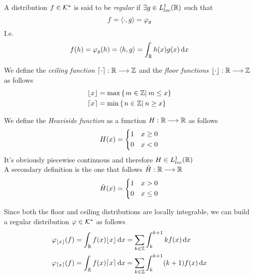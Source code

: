\documentclass[../complete.tex]{subfiles}
\begin{document}
\begin{dfn}
	A distribution $f\in\mathcal{K}^\star$ is said to be \textit{regular} if $\exists g\in L^1_{loc}(\mathbb{R})$ such that
	\begin{equation*}
		f=\langle \cdot, g \rangle=\varphi_g
	\end{equation*}
	I.e.
	\begin{equation*}
		f(h)=\varphi_g(h)=\langle h, g \rangle=\int_{\mathbb{R}}^{}h(x)g(x)\operatorname{d\!} x
	\end{equation*}
\end{dfn}
\begin{dfn}
	We define the \textit{ceiling function} $\lceil\cdot\rceil:\mathbb{R}\overset{}{\longrightarrow}\mathbb{Z}$ and the \textit{floor functions} $\lfloor\cdot\rfloor:\mathbb{R}\overset{}{\longrightarrow}\mathbb{Z}$ as follows
	\begin{equation}
		\begin{aligned}
			\lfloor x\rfloor&=\max\left\{ \left.m\in\mathbb{Z}\right|_{}m\le x \right\}\\
			\lceil x\rceil&=\min\left\{ \left.n\in\mathbb{Z}\right|_{}n\ge x \right\}
		\end{aligned}
		\label{eq:floorceil}
	\end{equation}
\end{dfn}
\begin{dfn}
	We define the \textit{Heaviside function} as a function $H:\mathbb{R}\overset{}{\longrightarrow}\mathbb{R}$ as follows
	\begin{equation*}
		H(x)=\begin{dcases}1&x\ge0\\0&x<0\end{dcases}
	\end{equation*}
	It's obviously piecewise continuous and therefore $H\in L^1_{loc}(\mathbb{R})$\\
	A secondary definition is the one that follows $\tilde{H}:\mathbb{R}\overset{}{\longrightarrow}\mathbb{R}$
	\begin{equation*}
		\tilde{H}(x)=\begin{dcases}1&x>0\\0&x\le0\end{dcases}
	\end{equation*}
\end{dfn}
\begin{eg}
	Since both the floor and ceiling distributions are locally integrable, we can build a regular distribution $\varphi\in\mathcal{K}^\star$ as follows
	\begin{equation*}
		\begin{aligned}
			\varphi_{\lfloor x\rfloor}(f)&=\int_{\mathbb{R}}^{}f(x)\lfloor x\rfloor\operatorname{d\!} x=\sum_{k\in\mathbb{Z}}\int_{k}^{k+1}kf(x)\operatorname{d\!} x\\
			\varphi_{\lceil x\rceil}(f)&=\int_{\mathbb{R}}^{}f(x)\lceil x\rceil\operatorname{d\!} x=\sum_{k\in\mathbb{Z}}\int_{k}^{k+1}(k+1)f(x)\operatorname{d\!} x
		\end{aligned}
	\end{equation*}
\end{eg}
\end{document}
